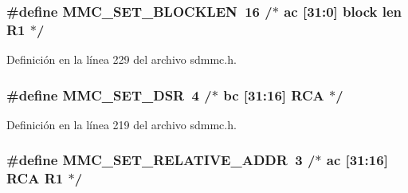 \subsubsection[{\texorpdfstring{M\+M\+C\+\_\+\+S\+E\+T\+\_\+\+B\+L\+O\+C\+K\+L\+EN}{MMC_SET_BLOCKLEN}}]{\setlength{\rightskip}{0pt plus 5cm}\#define M\+M\+C\+\_\+\+S\+E\+T\+\_\+\+B\+L\+O\+C\+K\+L\+EN~16		/$\ast$ ac   \mbox{[}31\+:0\mbox{]}  block len  R1  $\ast$/}\hypertarget{group___c_h_i_p___s_d_m_m_c___definitions_gab1142dc0b5000334f36fff50f7866b72}{}\label{group___c_h_i_p___s_d_m_m_c___definitions_gab1142dc0b5000334f36fff50f7866b72}


Definición en la línea 229 del archivo sdmmc.\+h.

\subsubsection[{\texorpdfstring{M\+M\+C\+\_\+\+S\+E\+T\+\_\+\+D\+SR}{MMC_SET_DSR}}]{\setlength{\rightskip}{0pt plus 5cm}\#define M\+M\+C\+\_\+\+S\+E\+T\+\_\+\+D\+SR~4		/$\ast$ bc   \mbox{[}31\+:16\mbox{]} R\+CA            $\ast$/}\hypertarget{group___c_h_i_p___s_d_m_m_c___definitions_ga62c12e663b5b677ff95121d952f63899}{}\label{group___c_h_i_p___s_d_m_m_c___definitions_ga62c12e663b5b677ff95121d952f63899}


Definición en la línea 219 del archivo sdmmc.\+h.

\subsubsection[{\texorpdfstring{M\+M\+C\+\_\+\+S\+E\+T\+\_\+\+R\+E\+L\+A\+T\+I\+V\+E\+\_\+\+A\+D\+DR}{MMC_SET_RELATIVE_ADDR}}]{\setlength{\rightskip}{0pt plus 5cm}\#define M\+M\+C\+\_\+\+S\+E\+T\+\_\+\+R\+E\+L\+A\+T\+I\+V\+E\+\_\+\+A\+D\+DR~3		/$\ast$ ac   \mbox{[}31\+:16\mbox{]} R\+CA        R1  $\ast$/}\hypertarget{group___c_h_i_p___s_d_m_m_c___definitions_ga9952b2deb72ad74ef3a1a84ed44d5a34}{}\label{group___c_h_i_p___s_d_m_m_c___definitions_ga9952b2deb72ad74ef3a1a84ed44d5a34}


